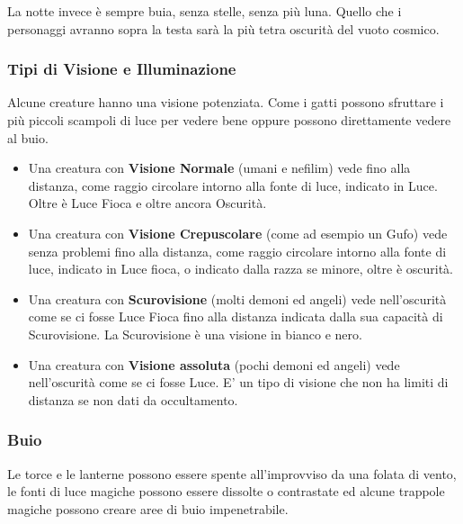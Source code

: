 \documentclass[12pt,a4paper,twoside,openany]{book}
\begin{document}
\begin{multicols}{2}
\begin{narratore}
La notte invece è sempre buia, senza stelle, senza più luna. Quello che i personaggi avranno sopra la testa sarà la più tetra oscurità del vuoto cosmico.\end{narratore}


\subsubsection{Tipi di Visione e Illuminazione}

Alcune creature hanno una visione potenziata. Come i gatti possono sfruttare i più piccoli scampoli di luce per vedere bene oppure possono direttamente vedere al buio.

\begin{itemize}
\item
Una creatura con \textbf{Visione Normale} (umani e nefilim) vede fino alla distanza, come raggio circolare intorno alla fonte di luce, indicato in Luce. Oltre è Luce Fioca e oltre ancora Oscurità.

\item
Una creatura con \textbf{Visione Crepuscolare} (come ad esempio un Gufo) vede senza problemi fino alla distanza, come raggio circolare intorno alla fonte di luce, indicato in Luce fioca, o indicato dalla razza se minore, oltre è oscurità.

\item
Una creatura con \textbf{Scurovisione} (molti demoni ed angeli)  vede nell'oscurità come se ci fosse Luce Fioca fino alla distanza indicata dalla sua capacità di Scurovisione.
La Scurovisione è una visione in bianco e nero.

\item
Una creatura con \textbf{Visione assoluta} (pochi demoni ed angeli)  vede nell'oscurità come se ci fosse Luce. E' un tipo di visione che non ha limiti di distanza se non dati da occultamento.

\end{itemize}


\subsubsection{Buio}

\label{buio}

Le torce e le lanterne possono essere spente all'improvviso da una folata di vento, le fonti di luce magiche possono essere dissolte o contrastate ed alcune trappole magiche possono creare aree di buio impenetrabile.


\end{multicols}
\end{document}

